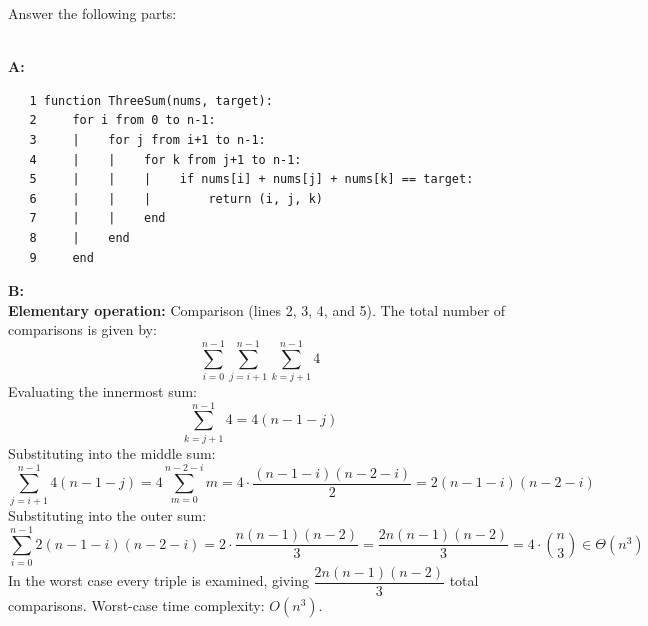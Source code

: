 \documentclass[10pt]{exam}
\begin{document}
\begin{questions}
\question[8] Answer the following parts:

\begin{solution}\\
    \textbf{A:}
    \begin{verbatim}
   1 function ThreeSum(nums, target):
   2     for i from 0 to n-1:
   3     |    for j from i+1 to n-1:
   4     |    |    for k from j+1 to n-1:
   5     |    |    |    if nums[i] + nums[j] + nums[k] == target:
   6     |    |    |        return (i, j, k)
   7     |    |    end
   8     |    end
   9     end
    \end{verbatim}
 
    \textbf{B:}\\
    \textbf{Elementary operation:} Comparison (lines 2, 3, 4, and 5).
    The total number of comparisons is given by:
    \[\sum_{i=0}^{n-1}\sum_{j=i+1}^{n-1}\sum_{k=j+1}^{n-1} 4\]
    Evaluating the innermost sum:
    \[\sum_{k=j+1}^{n-1} 4 = 4(n-1-j)\]
    Substituting into the middle sum:
    \[\sum_{j=i+1}^{n-1} 4(n-1-j)= 4\sum_{m=0}^{n-2-i} m
        = 4\cdot\frac{(n-1-i)(n-2-i)}{2}= 2(n-1-i)(n-2-i)\]
    Substituting into the outer sum:
    \[\sum_{i=0}^{n-1} 2(n-1-i)(n-2-i)= 2\cdot\frac{n(n-1)(n-2)}{3}
        = \frac{2n(n-1)(n-2)}{3}= 4\cdot\binom{n}{3} \in \Theta(n^3)\]
    In the worst case every triple is examined, giving $\dfrac{2n(n-1)(n-2)}{3}$ total comparisons.
    Worst-case time complexity: $O(n^3)$.
\end{solution}
\end{questions}
\end{document}

